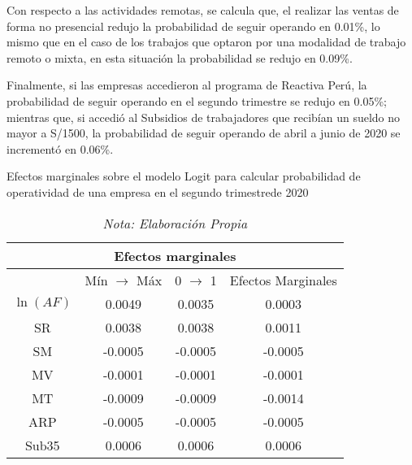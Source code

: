\documentclass[12pt]{article}
\begin{document}
        Con respecto a las actividades remotas, se calcula que, el realizar las ventas de forma no presencial redujo la probabilidad
        de seguir operando en 0.01\%, lo mismo que en el caso de los trabajos que optaron por una modalidad de trabajo remoto
        o mixta, en esta situación la probabilidad se redujo en 0.09\%.

        Finalmente, si las empresas accedieron al programa de Reactiva Perú, la probabilidad de seguir operando en el segundo
        trimestre se redujo en 0.05\%; mientras que, si accedió al Subsidios de trabajadores que recibían un sueldo no mayor a S/1500,
        la probabilidad de seguir operando de abril a junio de 2020 se incrementó en 0.06\%.
            \begin{table}[H]
                \raggedright
                \caption{Efectos marginales sobre el modelo Logit para calcular probabilidad de operatividad de una empresa en el segundo trimestrede 2020}
                \begin{tabular}{cccc}
                    \toprule
                    \multicolumn{4}{c}{Efectos marginales}\\
                    \midrule
                     & Mín $\longrightarrow$ Máx & 0 $\longrightarrow$ 1 & Efectos Marginales \\
                    \hline
                    $\ln\left(AF\right)$ & 0.0049 & 0.0035 & 0.0003 \\
                    \hline
                    SR & 0.0038 & 0.0038 & 0.0011\\
                    \hline
                    SM & -0.0005 & -0.0005 & -0.0005\\
                    \hline
                    MV & -0.0001 & -0.0001  & -0.0001\\
                    \hline
                    MT & -0.0009 & -0.0009 & -0.0014\\
                    \hline
                    ARP & -0.0005 & -0.0005 & -0.0005\\
                    \hline
                    Sub35 & 0.0006 & 0.0006 & 0.0006\\
                    \bottomrule
                \end{tabular}
                \caption*{\it Nota: Elaboración Propia}
                \label{tab: Tabla2}
            \end{table}
\end{document}
